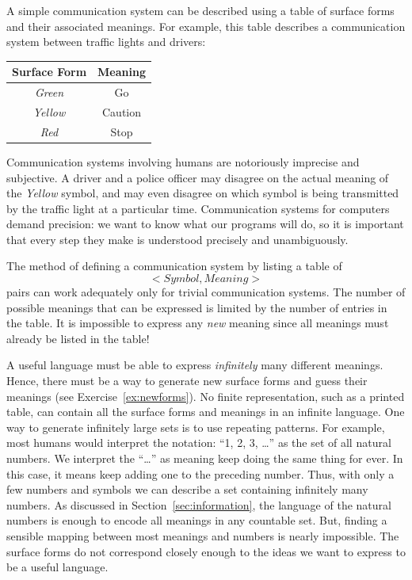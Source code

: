 A simple communication system can be described using a table of surface forms and their associated meanings.  For example, this table describes a communication system between traffic lights and drivers: 
\begin{center}\vspace*{-1ex}
\begin{tabular}{cc}
\quad Surface Form \quad & Meaning \\ \hline 
\emph{Green} & Go \\
\emph{Yellow} & Caution \\
\emph{Red} & Stop \\ 
\end{tabular}
\end{center}

Communication systems involving humans are notoriously imprecise and subjective.  A driver and a police officer may disagree on the actual meaning of the \emph{Yellow} symbol, and may even disagree on which symbol is being transmitted by the traffic light at a particular time.  Communication systems for computers demand precision: we want to know what our programs will do, so it is important that every step they make is understood precisely and unambiguously.

The method of defining a communication system by listing a table of 
	\[
<\textit{Symbol}, \textit{Meaning}>
\]
pairs can work adequately only for trivial communication systems.  The number of possible meanings that can be expressed is limited by the number of entries in the table.  It is impossible to express any \emph{new} meaning since all meanings must already be listed in the table!

 A useful language must be able to express \emph{infinitely} many different meanings.    Hence, there must be a way to generate new surface forms and guess their meanings (see Exercise~\ref{ex:newforms}).  No finite representation, such as a printed table, can contain all the surface forms and meanings in an infinite language.  
One way to generate infinitely large sets is to use repeating patterns.  For example, most humans would interpret the notation: ``1, 2, 3, \ldots''
as the set of all natural numbers.  We interpret the 	``\ldots'' as meaning keep doing the same thing for ever.  In this case, it means keep adding one to the preceding number. Thus, with only a few numbers and symbols we can describe a set containing infinitely many numbers.  As discussed in Section~\ref{sec:information}, the language of the natural numbers is enough to encode all meanings in any countable set.   But, finding a sensible mapping between most meanings and numbers is nearly impossible.  The surface forms do not correspond closely enough to the ideas we want to express to be a useful language.

